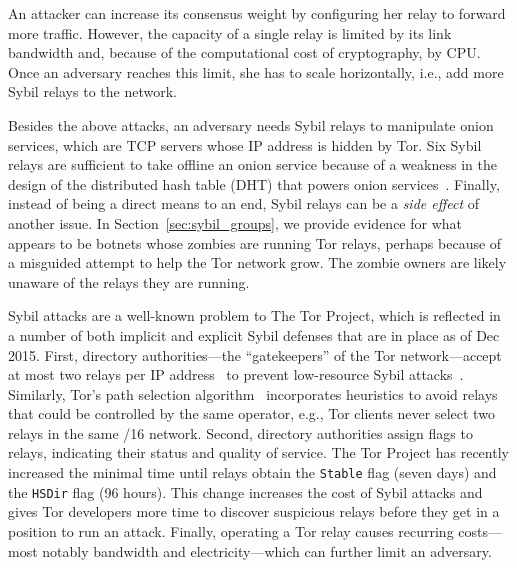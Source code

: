 An attacker can increase its consensus weight by configuring her relay to
forward more traffic.  However, the capacity of a single relay is limited by its
link bandwidth and, because of the computational cost of cryptography, by CPU.
Once an adversary reaches this limit, she has to scale horizontally, i.e., add
more Sybil relays to the network.

Besides the above attacks, an adversary needs Sybil relays to manipulate onion
services, which are TCP servers whose IP address is hidden by Tor.  Six Sybil
relays are sufficient to take offline an onion service because of a weakness in
the design of the distributed hash table (DHT) that powers onion
services~\cite{Biryukov2013a}.  Finally, instead of being a direct means to an
end, Sybil relays can be a \emph{side effect} of another issue.  In
Section~\ref{sec:sybil_groups}, we provide evidence for what appears to be
botnets whose zombies are running Tor relays, perhaps because of a misguided
attempt to help the Tor network grow.  The zombie owners are likely unaware of
the relays they are running.

Sybil attacks are a well-known problem to The Tor Project, which is reflected in
a number of both implicit and explicit Sybil defenses that are in place as of
Dec 2015.  First, directory authorities---the ``gatekeepers'' of the Tor
network---accept at most two relays per IP address~\cite{Bauer2007b} to prevent
low-resource Sybil attacks~\cite{Bauer2007a}.  Similarly, Tor's path selection
algorithm~\cite{path-spec} incorporates heuristics to avoid relays that could be
controlled by the same operator, e.g., Tor clients never select two relays in
the same /16 network.  Second, directory authorities assign flags to relays,
indicating their status and quality of service.  The Tor Project has recently
increased the minimal time until relays obtain the \texttt{Stable} flag (seven
days) and the \texttt{HSDir} flag (96 hours).  This change increases the cost of
Sybil attacks and gives Tor developers more time to discover suspicious relays
before they get in a position to run an attack.  Finally, operating a Tor relay
causes recurring costs---most notably bandwidth and electricity---which can
further limit an adversary.

